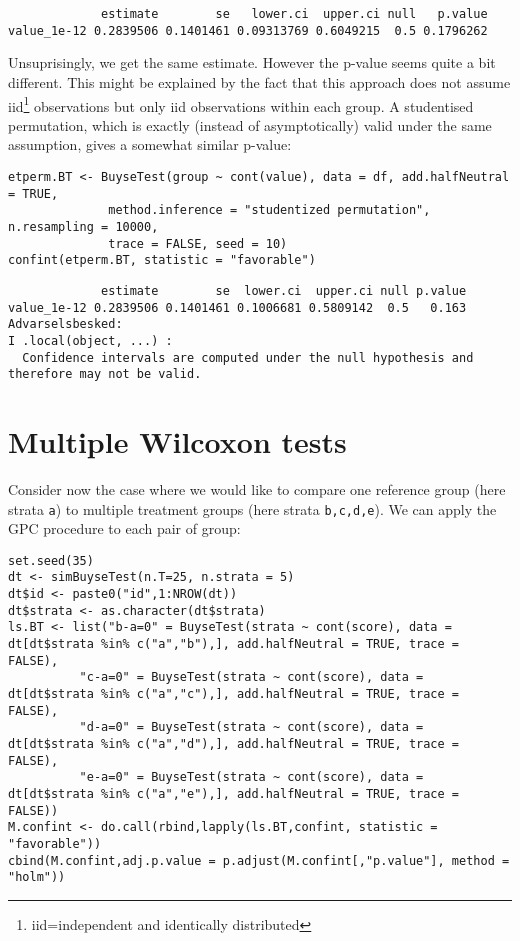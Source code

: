 \documentclass[12pt]{article}
\begin{document}
\begin{verbatim}
             estimate        se   lower.ci  upper.ci null   p.value
value_1e-12 0.2839506 0.1401461 0.09313769 0.6049215  0.5 0.1796262
\end{verbatim}


Unsuprisingly, we get the same estimate. However the p-value seems
quite a bit different. This might be explained by the fact that this
approach does not assume iid\footnote{iid=independent and identically
distributed} observations but only iid observations within each
group. A studentised permutation, which is exactly (instead of
asymptotically) valid under the same assumption, gives a somewhat
similar p-value:
\lstset{language=r,label= ,caption= ,captionpos=b,numbers=none}
\begin{lstlisting}
etperm.BT <- BuyseTest(group ~ cont(value), data = df, add.halfNeutral = TRUE,
		      method.inference = "studentized permutation", n.resampling = 10000,
		      trace = FALSE, seed = 10)
confint(etperm.BT, statistic = "favorable")
\end{lstlisting}

\begin{verbatim}
             estimate        se  lower.ci  upper.ci null p.value
value_1e-12 0.2839506 0.1401461 0.1006681 0.5809142  0.5   0.163
Advarselsbesked:
I .local(object, ...) :
  Confidence intervals are computed under the null hypothesis and therefore may not be valid.
\end{verbatim}

\section{Multiple Wilcoxon tests}
\label{sec:org3658132}

Consider now the case where we would like to compare one reference
group (here strata \texttt{a}) to multiple treatment groups (here strata
\texttt{b,c,d,e}). We can apply the GPC procedure to each pair of group:
\lstset{language=r,label= ,caption= ,captionpos=b,numbers=none}
\begin{lstlisting}
set.seed(35)
dt <- simBuyseTest(n.T=25, n.strata = 5)
dt$id <- paste0("id",1:NROW(dt))
dt$strata <- as.character(dt$strata) 
ls.BT <- list("b-a=0" = BuyseTest(strata ~ cont(score), data = dt[dt$strata %in% c("a","b"),], add.halfNeutral = TRUE, trace = FALSE),
	      "c-a=0" = BuyseTest(strata ~ cont(score), data = dt[dt$strata %in% c("a","c"),], add.halfNeutral = TRUE, trace = FALSE),
	      "d-a=0" = BuyseTest(strata ~ cont(score), data = dt[dt$strata %in% c("a","d"),], add.halfNeutral = TRUE, trace = FALSE),
	      "e-a=0" = BuyseTest(strata ~ cont(score), data = dt[dt$strata %in% c("a","e"),], add.halfNeutral = TRUE, trace = FALSE))
M.confint <- do.call(rbind,lapply(ls.BT,confint, statistic = "favorable"))
cbind(M.confint,adj.p.value = p.adjust(M.confint[,"p.value"], method = "holm"))
\end{lstlisting}
\end{document}
